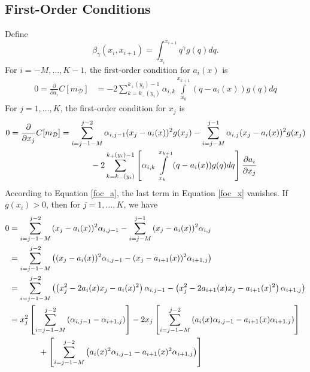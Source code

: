 \documentclass[12pt]{article}
\begin{document}
\subsection{First-Order Conditions}
Define
\begin{equation}
	\beta_{\gamma}(x_{i},x_{i+1})=\int_{x_{i}}^{x_{i+1}}{q^{\gamma}g(q)dq}.
\end{equation}
For $i=-M,\ldots,K-1$, the first-order condition for $a_{i}(x)$ is 
\begin{align}
	0=\frac{\partial}{\partial a_{i}}C[m_{\mathcal{D}}]&=-2\sum_{k=k_{-}(y_{i})}^{k_{+}(y_{i})-1}{\alpha_{i,k}\int\limits_{x_{k}}^{x_{k+1}}{(q-a_{i}(x))g(q)dq}}\label{foc_a}
\end{align}
For $j=1,\ldots,K$, the first-order condition for $x_{j}$ is
\begin{align}
	0=\frac{\partial}{\partial x_{j}}C[m_{\mathcal{D}}]&=\sum_{i=j-1-M}^{j-2}{\alpha_{i,j-1}(x_{j}-a_{i}(x))^{2}g(x_{j})}-\sum_{i=j-M}^{j-1}{\alpha_{i,j}(x_{j}-a_{i}(x))^{2}g(x_{j})}\notag\\
	&\hspace{.5in}-2\sum_{k=k_{-}(y_{i})}^{k_{+}(y_{i})-1}{\left[\alpha_{i,k}\int\displaylimits_{x_{k}}^{x_{k+1}}{(q-a_{i}(x))g(q)dq}\right]\frac{\partial a_{i}}{\partial x_{j}}}\label{foc_x}
\end{align}
According to Equation \ref{foc_a}, the last term in Equation \ref{foc_x} vanishes. If $g(x_{i})>0$, then for $j=1,\ldots,K$, we have
\begin{align}
	0&=\sum_{i=j-1-M}^{j-2}{(x_{j}-a_{i}(x))^{2}}\alpha_{i,j-1}-\sum_{i=j-M}^{j-1}{(x_{j}-a_{i}(x))^{2}\alpha_{i,j}}\\
	&=\sum_{i=j-1-M}^{j-2}{\left((x_{j}-a_{i}(x))^{2}\alpha_{i,j-1}-(x_{j}-a_{i+1}(x))^{2}\alpha_{i+1,j}\right)}\\
	&=\sum_{i=j-1-M}^{j-2}{\left(\left(x_{j}^{2}-2a_{i}(x)x_{j}-a_{i}(x)^{2}\right)\alpha_{i,j-1}-\left(x_{j}^{2}-2a_{i+1}(x)x_{j}-a_{i+1}(x)^{2}\right)\alpha_{i+1,j}\right)}\\
	&=x_{j}^{2}\left[\sum_{i=j-1-M}^{j-2}{(\alpha_{i,j-1}-\alpha_{i+1,j})}\right]-2x_{j}\left[\sum_{i=j-1-M}^{j-2}{\left(a_{i}(x)\alpha_{i,j-1}-a_{i+1}(x)\alpha_{i+1,j}\right)}\right]\notag\\
	&\hspace{.5in}+\left[\sum_{i=j-1-M}^{j-2}{\left(a_{i}(x)^{2}\alpha_{i,j-1}-a_{i+1}(x)^{2}\alpha_{i+1,j}\right)}\right]
\end{align}
\end{document}
